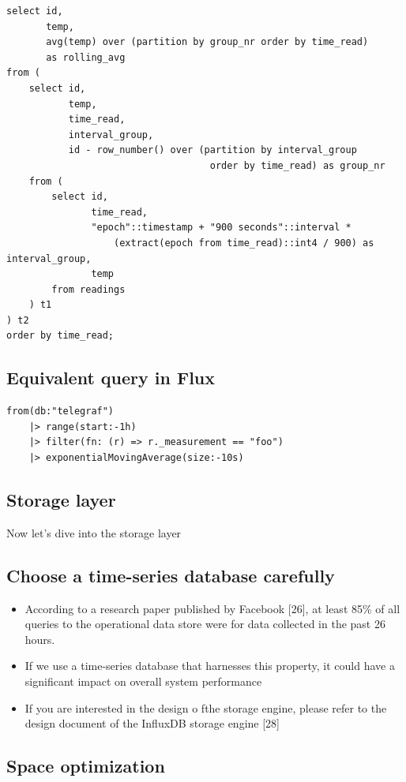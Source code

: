 \documentclass{report}
\theoremstyle{definition}
\let\oldsubsection\subsection
\renewcommand{\subsection}{\oldsubsection*}
\begin{document}
\begin{lstlisting}
select id,
       temp,
       avg(temp) over (partition by group_nr order by time_read)
       as rolling_avg
from (
    select id,
           temp,
           time_read,
           interval_group,
           id - row_number() over (partition by interval_group
                                    order by time_read) as group_nr
    from (
        select id,
               time_read,
               "epoch"::timestamp + "900 seconds"::interval *
                   (extract(epoch from time_read)::int4 / 900) as interval_group,
               temp
        from readings
    ) t1
) t2
order by time_read;
\end{lstlisting}

\subsection{Equivalent query in Flux}

\begin{lstlisting}
from(db:"telegraf")
    |> range(start:-1h)
    |> filter(fn: (r) => r._measurement == "foo")
    |> exponentialMovingAverage(size:-10s)
\end{lstlisting}


\subsection{Storage layer}

Now let's dive into the storage layer

\subsection{Choose a time-series database carefully}

\begin{itemize}
\item
According to a research paper published by Facebook [26], at least 85\% of all queries to the operational data store were for data collected in the past 26 hours.
\item
If we use a time-series database that harnesses this property, it could have a significant impact on overall system performance
\item
If you are interested in the design o fthe storage engine, please refer to the design document of the InfluxDB storage engine [28]
\end{itemize}

\subsection{Space optimization}
\end{document}
